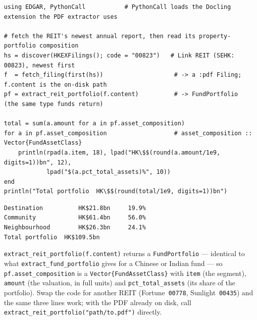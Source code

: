 \documentclass[11pt,a4paper]{report}
\begin{document}
\begin{lstlisting}
using EDGAR, PythonCall           # PythonCall loads the Docling extension the PDF extractor uses

# fetch the REIT's newest annual report, then read its property-portfolio composition
hs = discover(HKEXFilings(); code = "00823")   # Link REIT (SEHK: 00823), newest first
f  = fetch_filing(first(hs))                    # -> a :pdf Filing; f.content is the on-disk path
pf = extract_reit_portfolio(f.content)          # -> FundPortfolio (the same type funds return)

total = sum(a.amount for a in pf.asset_composition)
for a in pf.asset_composition                   # asset_composition :: Vector{FundAssetClass}
    println(rpad(a.item, 18), lpad("HK\$$(round(a.amount/1e9, digits=1))bn", 12),
            lpad("$(a.pct_total_assets)%", 10))
end
println("Total portfolio  HK\$$(round(total/1e9, digits=1))bn")
\end{lstlisting}

\begin{lstlisting}
Destination          HK$21.8bn     19.9%
Community            HK$61.4bn     56.0%
Neighbourhood        HK$26.3bn     24.1%
Total portfolio  HK$109.5bn
\end{lstlisting}

\noindent \texttt{extract\_reit\_portfolio(f.content)} returns a \texttt{FundPortfolio} --- identical to what
\texttt{extract\_fund\_portfolio} gives for a Chinese or Indian fund --- so \texttt{pf.asset\_composition} is a
\texttt{Vector\{FundAssetClass\}} with \texttt{item} (the segment), \texttt{amount} (the valuation, in full
units) and \texttt{pct\_total\_assets} (its share of the portfolio). Swap the code for another REIT
(Fortune~\texttt{00778}, Sunlight~\texttt{00435}) and the same three lines work; with the PDF already on disk,
call \texttt{extract\_reit\_portfolio("path/to.pdf")} directly.
\end{document}
